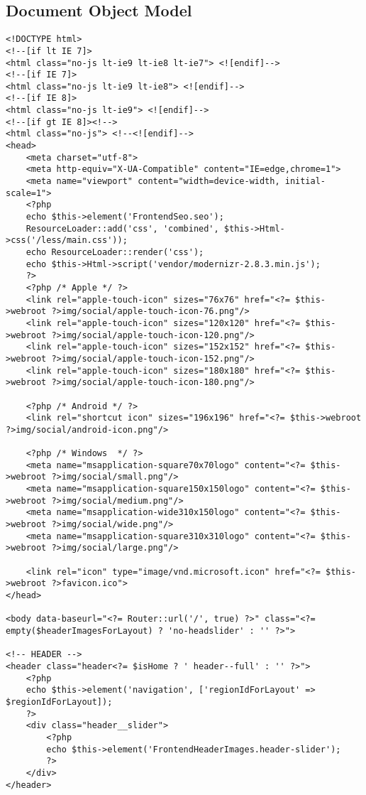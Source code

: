 \subsection{Document Object Model}
\label{listing:DOM}

\begin{lstlisting}[style=htmlcssjs, backgroundcolor = \color{lightgray},
caption=DOM der index.php] 
<!DOCTYPE html>
<!--[if lt IE 7]>
<html class="no-js lt-ie9 lt-ie8 lt-ie7"> <![endif]-->
<!--[if IE 7]>
<html class="no-js lt-ie9 lt-ie8"> <![endif]-->
<!--[if IE 8]>
<html class="no-js lt-ie9"> <![endif]-->
<!--[if gt IE 8]><!-->
<html class="no-js"> <!--<![endif]-->
<head>
    <meta charset="utf-8">
    <meta http-equiv="X-UA-Compatible" content="IE=edge,chrome=1">
    <meta name="viewport" content="width=device-width, initial-scale=1">
    <?php
    echo $this->element('FrontendSeo.seo');
    ResourceLoader::add('css', 'combined', $this->Html->css('/less/main.css'));
    echo ResourceLoader::render('css');
    echo $this->Html->script('vendor/modernizr-2.8.3.min.js');
    ?>
    <?php /* Apple */ ?>
    <link rel="apple-touch-icon" sizes="76x76" href="<?= $this->webroot ?>img/social/apple-touch-icon-76.png"/>
    <link rel="apple-touch-icon" sizes="120x120" href="<?= $this->webroot ?>img/social/apple-touch-icon-120.png"/>
    <link rel="apple-touch-icon" sizes="152x152" href="<?= $this->webroot ?>img/social/apple-touch-icon-152.png"/>
    <link rel="apple-touch-icon" sizes="180x180" href="<?= $this->webroot ?>img/social/apple-touch-icon-180.png"/>

    <?php /* Android */ ?>
    <link rel="shortcut icon" sizes="196x196" href="<?= $this->webroot ?>img/social/android-icon.png"/>

    <?php /* Windows  */ ?>
    <meta name="msapplication-square70x70logo" content="<?= $this->webroot ?>img/social/small.png"/>
    <meta name="msapplication-square150x150logo" content="<?= $this->webroot ?>img/social/medium.png"/>
    <meta name="msapplication-wide310x150logo" content="<?= $this->webroot ?>img/social/wide.png"/>
    <meta name="msapplication-square310x310logo" content="<?= $this->webroot ?>img/social/large.png"/>

    <link rel="icon" type="image/vnd.microsoft.icon" href="<?= $this->webroot ?>favicon.ico">
</head>

<body data-baseurl="<?= Router::url('/', true) ?>" class="<?= empty($headerImagesForLayout) ? 'no-headslider' : '' ?>">

<!-- HEADER -->
<header class="header<?= $isHome ? ' header--full' : '' ?>">
    <?php
    echo $this->element('navigation', ['regionIdForLayout' => $regionIdForLayout]);
    ?>
    <div class="header__slider">
        <?php
        echo $this->element('FrontendHeaderImages.header-slider');
        ?>
    </div>
</header>


\end{lstlisting}
